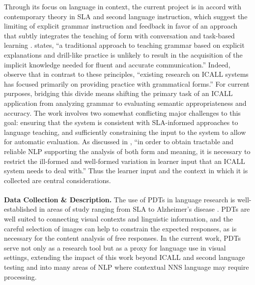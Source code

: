 \documentclass[11pt]{article}
\begin{document}
Through its focus on language in context, the current project is in accord with contemporary theory in SLA and second language instruction, which suggest the limiting of explicit grammar instruction and feedback in favor of an approach that subtly integrates the teaching of form with conversation and task-based learning \citep{CelceMurcia:1991:GrammarPedagogy, CelceMurcia:2002:GrammarThroughContext, LarsenFreeman:1991:TeachingGrammar}. \citet{Ellis:2006:CurrentIssues} states, ``a traditional approach to teaching grammar based on explicit explanations and drill-like practice is unlikely to result in the acquisition of the implicit knowledge needed for fluent and accurate communication.'' Indeed, \citet{bailey:meurers:08} observe that in contrast to these principles, ``existing research on ICALL systems has focused primarily on providing practice with grammatical forms.'' For current purposes, bridging this divide means shifting the primary task of an ICALL application from analyzing grammar to evaluating semantic appropriateness and accuracy. The work involves two somewhat conflicting major challenges to this goal: ensuring that the system is consistent with SLA-informed approaches to language teaching, and sufficiently constraining the input to the system to allow for automatic evaluation. As discussed in \citet{Amaral.Meurers-11}, ``in order to obtain tractable and reliable NLP supporting the analysis of both form and meaning, it is necessary to restrict the ill-formed and well-formed variation in learner input that an ICALL system needs to deal with.'' Thus the learner input and the context in which it is collected are central considerations.\\
\\
\textbf{Data Collection \& Description.} The use of PDTs in language research is well-established in areas of study ranging from SLA to Alzheimer's disease \citep{ellis2000task, forbes2005detecting}. PDTs are well suited to connecting visual contexts and linguistic information, and the careful selection of images can help to constrain the expected responses, as is necessary for the content analysis of free responses. In the current work, PDTs serve not only as a research tool but as a proxy for language use in visual settings, extending the impact of this work beyond ICALL and second language testing and into many areas of NLP where contextual NNS language may require processing.
\end{document}
